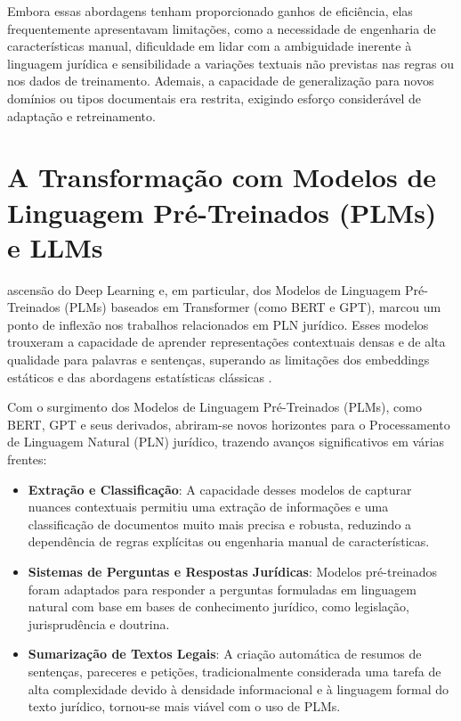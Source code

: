 Embora essas abordagens tenham proporcionado ganhos de eficiência, elas frequentemente apresentavam limitações, como a necessidade de engenharia de características manual, dificuldade em lidar com a ambiguidade inerente à linguagem jurídica e sensibilidade a variações textuais não previstas nas regras ou nos dados de treinamento. Ademais, a capacidade de generalização para novos domínios ou tipos documentais era restrita, exigindo esforço considerável de adaptação e retreinamento.

\section{A Transformação com Modelos de Linguagem Pré-Treinados (PLMs) e LLMs}
\label{sec:transformacao-plm-llm}

 ascensão do Deep Learning e, em particular, dos Modelos de Linguagem Pré-Treinados (PLMs) baseados em Transformer (como BERT e GPT), marcou um ponto de inflexão nos trabalhos relacionados em PLN jurídico. Esses modelos trouxeram a capacidade de aprender representações contextuais densas e de alta qualidade para palavras e sentenças, superando as limitações dos embeddings estáticos e das abordagens estatísticas clássicas \cite{devlin_bert:_2018, katz_natural_2023}.

 Com o surgimento dos Modelos de Linguagem Pré-Treinados (PLMs), como BERT, GPT e seus derivados, abriram-se novos horizontes para o Processamento de Linguagem Natural (PLN) jurídico, trazendo avanços significativos em várias frentes:

\begin{itemize}
    \item \textbf{Extração e Classificação}: A capacidade desses modelos de capturar nuances contextuais permitiu uma extração de informações e uma classificação de documentos muito mais precisa e robusta, reduzindo a dependência de regras explícitas ou engenharia manual de características.
    
    \item \textbf{Sistemas de Perguntas e Respostas Jurídicas}: Modelos pré-treinados foram adaptados para responder a perguntas formuladas em linguagem natural com base em bases de conhecimento jurídico, como legislação, jurisprudência e doutrina.
    
    \item \textbf{Sumarização de Textos Legais}: A criação automática de resumos de sentenças, pareceres e petições, tradicionalmente considerada uma tarefa de alta complexidade devido à densidade informacional e à linguagem formal do texto jurídico, tornou-se mais viável com o uso de PLMs.
\end{itemize}


